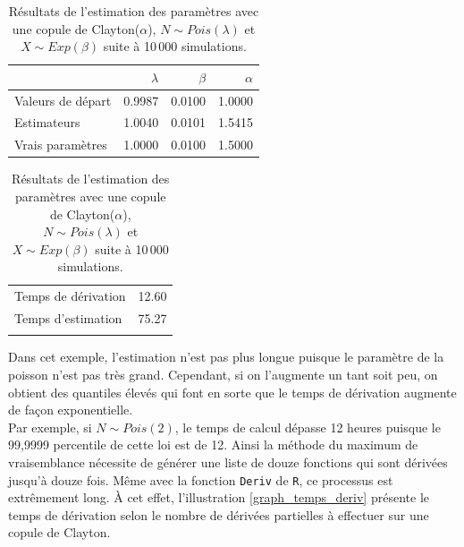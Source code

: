 \documentclass{article}
\begin{document}
		\begin{table}[H]
			\centering
			\begin{tabular}{lrrr}
				\hline
				& $\lambda$ & $\beta$ & $\alpha$ \\ 
				\hline
				Valeurs de départ & 0.9987 & 0.0100 & 1.0000 \\ 
				Estimateurs & 1.0040 & 0.0101 & 1.5415 \\ 
				Vrais paramètres & 1.0000 & 0.0100 & 1.5000 \\
				\hline
			\end{tabular}
		\begin{tabular}{lr}
			\hline
			&  \\ 
			\hline
			Temps de dérivation & 12.60 \\ 
			Temps d'estimation & 75.27 \\ 
			\\
			\hline
		\end{tabular}
			\caption[Résultats du scénario \ref{scenario_Clayton_Pois}]{Résultats de l'estimation des paramètres avec une copule de Clayton($\alpha$), $N\sim Pois(\lambda)$ et $X \sim Exp(\beta)$ suite à 10\,000 simulations.}\label{tbl_Clayton_Poisson}
		\end{table}
	
		Dans cet exemple, l'estimation n'est pas plus longue puisque le paramètre de la poisson n'est pas très grand. Cependant, si on l'augmente un tant soit peu, on obtient des quantiles élevés qui font en sorte que le temps de dérivation augmente de façon exponentielle.\\
	
		Par exemple, si $N \sim Pois(2)$, le temps de calcul dépasse 12 heures puisque le 99,9999 percentile de cette loi est de 12. Ainsi la méthode du maximum de vraisemblance nécessite de générer une liste de douze fonctions qui sont dérivées jusqu'à douze fois. Même avec la fonction \texttt{Deriv} de \texttt{R}, ce processus est extrêmement long. À cet effet, l'illustration \ref{graph_temps_deriv} présente le temps de dérivation selon le nombre de dérivées partielles à effectuer sur une copule de Clayton.
		
\end{document}
